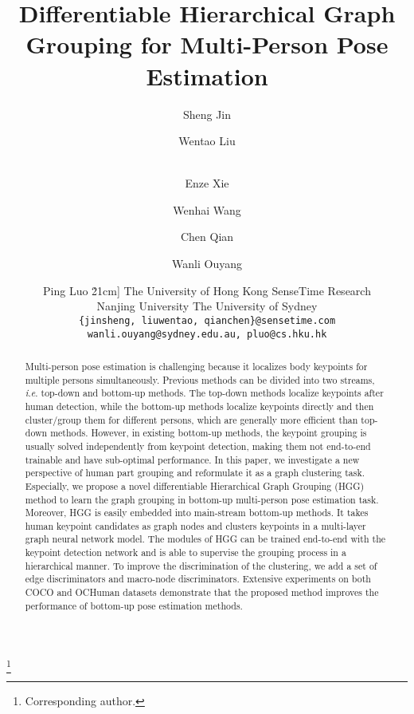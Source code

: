 \documentclass[runningheads]{llncs}
\newcommand\blfootnote[1]{\begingroup
	\renewcommand\thefootnote{}\footnote{#1}\addtocounter{footnote}{-1}\endgroup
}
\newcommand{\ie}{\textit{i}.\textit{e}. }
\begin{document}
	\captionsetup[figure]{labelsep=period}
	\captionsetup[table]{labelsep=period}
\pagestyle{headings}
	\mainmatter
	\def\ECCVSubNumber{386}  

	\title{Differentiable Hierarchical Graph Grouping for Multi-Person Pose Estimation}
	
\begin{comment}
	\titlerunning{ECCV-20 submission ID \ECCVSubNumber} 
	\authorrunning{ECCV-20 submission ID \ECCVSubNumber} 
	\author{Anonymous ECCV submission}
	\institute{Paper ID \ECCVSubNumber}
	\end{comment}


\author{Sheng Jin \and
		Wentao Liu\inst{2\dagger} \and \\
		Enze Xie \and Wenhai Wang \and
		Chen Qian \and Wanli Ouyang \and Ping Luo  \.21cm]
		 The University of Hong Kong \quad
		 SenseTime Research \\
		 Nanjing University \quad
		 The University of Sydney \\
		\tt\small \{jinsheng, liuwentao, qianchen\}@sensetime.com \quad
		wanli.ouyang@sydney.edu.au, pluo@cs.hku.hk}
	
\institute{}
\maketitle
	
	\blfootnote{Corresponding author.}
	\begin{abstract}
		Multi-person pose estimation is challenging because it localizes body keypoints for multiple persons simultaneously. Previous methods can be divided into two streams, \ie top-down and bottom-up methods. The top-down methods localize keypoints after human detection, while the bottom-up methods localize keypoints directly and then cluster/group them for different persons, which are generally more efficient than top-down methods. However, in existing bottom-up methods, the keypoint grouping is usually solved independently from keypoint detection, making them not end-to-end trainable and have sub-optimal performance. In this paper, we investigate a new perspective of human part grouping and reformulate it as a graph clustering task. Especially, we propose a novel differentiable Hierarchical Graph Grouping (HGG) method to learn the graph grouping in bottom-up multi-person pose estimation task. Moreover, HGG is easily embedded into main-stream bottom-up methods. It takes human keypoint candidates as graph nodes and clusters keypoints in a multi-layer graph neural network model. The modules of HGG can be trained end-to-end with the keypoint detection network and is able to supervise the grouping process in a hierarchical manner. To improve the discrimination of the clustering, we add a set of edge discriminators and macro-node discriminators. Extensive experiments on both COCO and OCHuman datasets demonstrate that the proposed method improves the performance of bottom-up pose estimation methods.
	\end{abstract}
	
\end{document}
